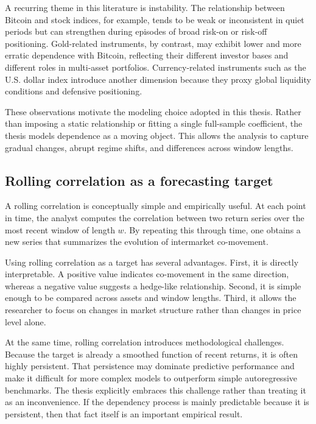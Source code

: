 A recurring theme in this literature is instability. The relationship between Bitcoin and stock indices, for example, tends to be weak or inconsistent in quiet periods but can strengthen during episodes of broad risk-on or risk-off positioning. Gold-related instruments, by contrast, may exhibit lower and more erratic dependence with Bitcoin, reflecting their different investor bases and different roles in multi-asset portfolios. Currency-related instruments such as the U.S. dollar index introduce another dimension because they proxy global liquidity conditions and defensive positioning.

These observations motivate the modeling choice adopted in this thesis. Rather than imposing a static relationship or fitting a single full-sample coefficient, the thesis models dependence as a moving object. This allows the analysis to capture gradual changes, abrupt regime shifts, and differences across window lengths.

\subsection{Rolling correlation as a forecasting target}

A rolling correlation is conceptually simple and empirically useful. At each point in time, the analyst computes the correlation between two return series over the most recent window of length $w$. By repeating this through time, one obtains a new series that summarizes the evolution of intermarket co-movement.

Using rolling correlation as a target has several advantages. First, it is directly interpretable. A positive value indicates co-movement in the same direction, whereas a negative value suggests a hedge-like relationship. Second, it is simple enough to be compared across assets and window lengths. Third, it allows the researcher to focus on changes in market structure rather than changes in price level alone.

At the same time, rolling correlation introduces methodological challenges. Because the target is already a smoothed function of recent returns, it is often highly persistent. That persistence may dominate predictive performance and make it difficult for more complex models to outperform simple autoregressive benchmarks. The thesis explicitly embraces this challenge rather than treating it as an inconvenience. If the dependency process is mainly predictable because it is persistent, then that fact itself is an important empirical result.

